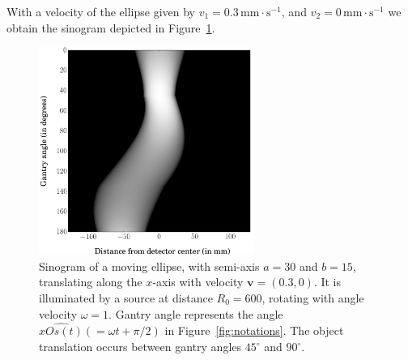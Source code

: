 \documentclass[twocolumn]{IEEEtran}
\newcommand{\bv}{\mathbf{v}}
\begin{document}
With a velocity of the ellipse given by $v_1 = 0.3 \, \textrm{mm} \cdot \textrm{s}^{-1}$, and $v_2 = 0 \, \textrm{mm} \cdot \textrm{s}^{-1}$ we obtain the sinogram depicted in Figure~\ref{fig:sinogram}.
\begin{figure}[!ht]
	\centering
	\includegraphics[width=70mm]{figs/sinogram.png}
	\caption{Sinogram of a moving ellipse, with semi-axis $a = 30$ and $b = 15$, translating along the $x$-axis with velocity $\bv = (0.3,0)$. It is illuminated by a source at distance $R_0 = 600$, rotating with angle velocity $\omega = 1$. Gantry angle represents the angle $\widehat{xOs(t)} (= \omega t + \pi/2)$ in Figure~\ref{fig:notations}. The object translation occurs between gantry angles $45^{\circ}$ and $90^{\circ}$.\label{fig:sinogram}}
\end{figure}
\end{document}
